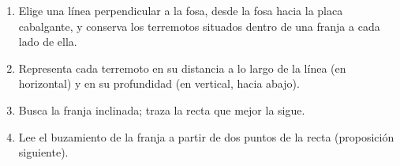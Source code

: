 \begin{method}\label{met:g11:subduction-zones:section}
\begin{enumerate}
  \item Elige una línea perpendicular a la fosa, desde la fosa hacia la placa
        cabalgante, y conserva los terremotos situados dentro de una franja a
        cada lado de ella.
  \item Representa cada terremoto en su distancia a lo largo de la línea (en
        horizontal) y en su profundidad (en vertical, hacia abajo).
  \item Busca la franja inclinada; traza la recta que mejor la sigue.
  \item Lee el buzamiento de la franja a partir de dos puntos de la recta
        (proposición siguiente).
\end{enumerate}
\end{method}

